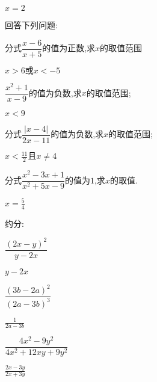 \documentclass[cn,blue,12pt]{elegantbook}
\begin{document}
\begin{xiti}[resume]
\begin{multicols}{2}
\begin{xiti}
\begin{solution}
                \(x=2\)\\
\end{solution}
        \end{xiti}
    \end{multicols}
\item 回答下列问题:
    \begin{xiti}
        \setlength{\itemsep}{4.5ex}
    \item 分式\(\dfrac{x-6}{x+5}\)的值为正数,求\( x \)的取值范围
\begin{solution}
                \(x>6\text{或}x<-5\)\\
\end{solution}
    \item \(\dfrac{x^2+1}{x-9}\)的值为负数,求\(x\)的取值范围;
\begin{solution}
                \(x<9\)\\
\end{solution}
    \item 分式\(\dfrac{|x-4|}{2x-11}\)的值为负数,求\(x\)的取值范围;
\begin{solution}
                \(x<\frac{11}{2}\text{且}x\ne 4\)\\
\end{solution}
    \item 分式\(\dfrac{x^2-3x+1}{x^2+5x-9}\)的值为\(1\),求\(x\)的取值.
\begin{solution}
                \(x=\frac{5}{4}\)\\
\end{solution}
    \end{xiti}
\item 约分:
    \begin{multicols}{2}
        \begin{xiti}
            \setlength{\itemsep}{4.5ex}
        \item \(\dfrac{(2x-y)^2}{y-2x}\)
\begin{solution}
                \(y-2x\)\\
\end{solution}
        \item \(\dfrac{(3b-2a)^2}{(2a-3b)^3}\)
\begin{solution}
                \(\frac{1}{2a-3b}\)\\
\end{solution}
        \item \(\dfrac{4x^2-9y^2}{4x^2+12xy+9y^2}\)
\begin{solution}
                \(\frac{2x-3y}{2x+3y}\)\\

\end{solution}
\end{xiti}
\end{multicols}
\end{xiti}
\end{document}

